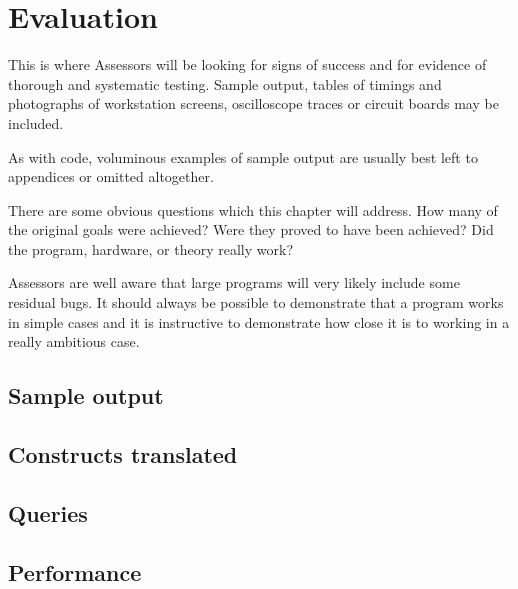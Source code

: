 \chapter{Evaluation}
\label{chapter:evaluation}

This is where Assessors will be looking for signs of success and for evidence
of thorough and systematic testing. Sample output, tables of timings and
photographs of workstation screens, oscilloscope traces or circuit boards may
be included. 

As with code, voluminous examples of sample output are usually best left to
appendices or omitted altogether. 

There are some obvious questions which this chapter will address. How many of
the original goals were achieved? Were they proved to have been achieved? Did
the program, hardware, or theory really work? 

Assessors are well aware that large programs will very likely include some
residual bugs. It should always be possible to demonstrate that a program works
in simple cases and it is instructive to demonstrate how close it is to working
in a really ambitious case. 

\section{Sample output}

\section{Constructs translated}

\section{Queries}

\section{Performance}
